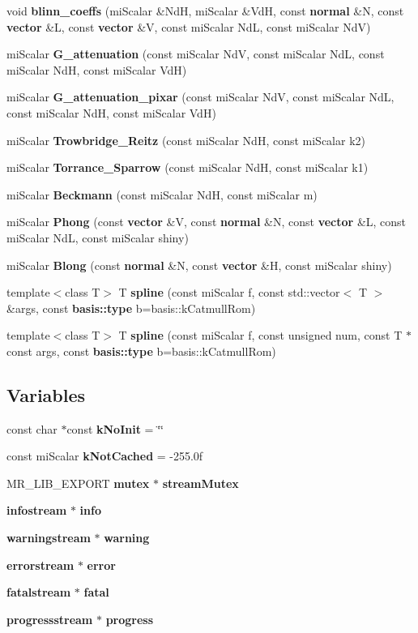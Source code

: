 \begin{CompactItemize}
void {\bf blinn\_\-coeffs} (mi\-Scalar \&Nd\-H, mi\-Scalar \&Vd\-H, const {\bf normal} \&N, const {\bf vector} \&L, const {\bf vector} \&V, const mi\-Scalar Nd\-L, const mi\-Scalar Nd\-V)
\item 
mi\-Scalar {\bf G\_\-attenuation} (const mi\-Scalar Nd\-V, const mi\-Scalar Nd\-L, const mi\-Scalar Nd\-H, const mi\-Scalar Vd\-H)
\item 
mi\-Scalar {\bf G\_\-attenuation\_\-pixar} (const mi\-Scalar Nd\-V, const mi\-Scalar Nd\-L, const mi\-Scalar Nd\-H, const mi\-Scalar Vd\-H)
\item 
mi\-Scalar {\bf Trowbridge\_\-Reitz} (const mi\-Scalar Nd\-H, const mi\-Scalar k2)
\item 
mi\-Scalar {\bf Torrance\_\-Sparrow} (const mi\-Scalar Nd\-H, const mi\-Scalar k1)
\item 
mi\-Scalar {\bf Beckmann} (const mi\-Scalar Nd\-H, const mi\-Scalar m)
\item 
mi\-Scalar {\bf Phong} (const {\bf vector} \&V, const {\bf normal} \&N, const {\bf vector} \&L, const mi\-Scalar Nd\-L, const mi\-Scalar shiny)
\item 
mi\-Scalar {\bf Blong} (const {\bf normal} \&N, const {\bf vector} \&H, const mi\-Scalar shiny)
\item 
template$<$class T$>$ T {\bf spline} (const mi\-Scalar f, const std::vector$<$ T $>$ \&args, const {\bf basis::type} b=basis::k\-Catmull\-Rom)
\item 
template$<$class T$>$ T {\bf spline} (const mi\-Scalar f, const unsigned num, const T $\ast$const args, const {\bf basis::type} b=basis::k\-Catmull\-Rom)
\end{CompactItemize}
\subsection*{Variables}
\begin{CompactItemize}
\item 
const char $\ast$const  {\bf k\-No\-Init} = \char`\"{}\char`\"{}
\item 
const mi\-Scalar {\bf k\-Not\-Cached} = -255.0f
\item 
MR\_\-LIB\_\-EXPORT {\bf mutex} $\ast$ {\bf stream\-Mutex}
\item 
{\bf infostream} $\ast$ {\bf info}
\item 
{\bf warningstream} $\ast$ {\bf warning}
\item 
{\bf errorstream} $\ast$ {\bf error}
\item 
{\bf fatalstream} $\ast$ {\bf fatal}
\item 
{\bf progressstream} $\ast$ {\bf progress}
\end{CompactItemize}


